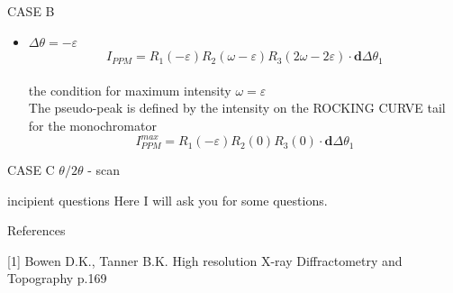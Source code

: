 \documentclass{beamer}
\begin{document}
\begin{frame}{CASE B }
\begin{itemize}
\item  $\Delta \theta = -\varepsilon$
$$I_{PPM}= R_1(-\varepsilon)R_2(\omega - \varepsilon)R_3(2\omega - 2\varepsilon)\cdot \pmb{d}\Delta\theta_1$$ \\ the condition for maximum intensity $\omega = \varepsilon$\\
The pseudo-peak is defined by the intensity on the ROCKING CURVE tail for the monochromator
$$I_{PPM}^{max} = R_1(-\varepsilon)R_2(0)R_3(0)\cdot \pmb{d}\Delta\theta_1$$
\end{itemize}
\end{frame}


\begin{frame}{CASE C $\theta/2\theta$ - scan \fbox{$\varepsilon = 2\omega $ }}

\end{frame}


\begin{frame}{incipient questions}
Here I will ask you for some questions.
\end{frame}

\begin{frame}{References}

[1] Bowen D.K., Tanner B.K. High resolution X-ray Diffractometry and Topography p.169
\end{frame}
\end{document}
